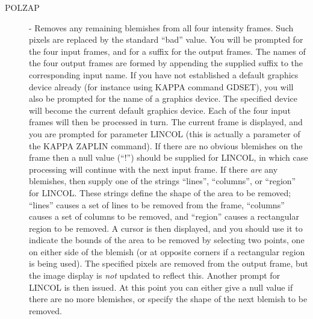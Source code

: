 \begin{description}

\item [POLZAP] - Removes any remaining blemishes from all four
intensity frames.  Such pixels are replaced by the standard ``bad''
value. You will be prompted for the four input frames, and for a suffix
for the output frames. The names of the four output frames are formed
by appending the supplied suffix to the corresponding input name. If
you have not established a default graphics device already (for
instance using {\small KAPPA} command {\small GDSET}), you will also be
prompted for the name of a graphics device. The specified device will
become the current default graphics device. Each of the four input
frames will then be processed in turn. The current frame is displayed,
and you are prompted for parameter {\small LINCOL} (this is actually a
parameter of the {\small KAPPA ZAPLIN} command). If there are no
obvious blemishes on the frame then a null value (``!'') should be
supplied for {\small LINCOL}, in which case processing will continue
with the next input frame. If there {\em are} any blemishes, then
supply one of the strings ``lines'', ``columns'', or ``region'' for
{\small LINCOL}. These strings define the shape of the area to be
removed; ``lines'' causes a set of lines to be removed from the frame,
``columns'' causes a set of columns to be removed, and ``region''
causes a rectangular region to be removed.  A cursor is then displayed,
and you should use it to indicate the bounds of the area to be removed
by selecting two points, one on either side of the blemish (or at
opposite corners if a rectangular region is being used). The specified
pixels are removed from the output frame, but the image display is {\em
not} updated to reflect this. Another prompt for {\small LINCOL} is
then issued. At this point you can either give a null value if there
are no more blemishes, or specify the shape of the next blemish to be
removed.


\end{description}

